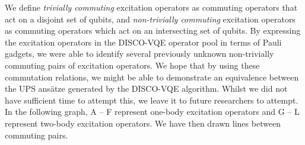 We define \textit{trivially commuting} excitation operators as commuting operators that act on a disjoint set of qubits, and \textit{non-trivially commuting} excitation operators as commuting operators which act on an intersecting set of qubits. By expressing the excitation operators in the DISCO-VQE operator pool in terms of Pauli gadgets, we were able to identify several previously unknown non-trivially commuting pairs of excitation operators. We hope that by using these commutation relations, we might be able to demonstrate an equivalence between the UPS ansätze generated by the DISCO-VQE algorithm. Whilst we did not have sufficient time to attempt this, we leave it to future researchers to attempt. In the following graph, A -- F represent one-body excitation operators and G -- L represent two-body excitation operators. We have then drawn lines between commuting pairs.

